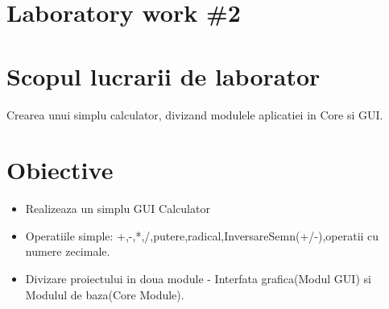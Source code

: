 \section*{Laboratory work \#2}

\section{Scopul lucrarii de laborator}
Crearea unui simplu calculator, divizand modulele aplicatiei in Core si GUI.
\section{Obiective}

\begin{itemize}
\item Realizeaza un simplu GUI Calculator
\item Operatiile simple: +,-,*,/,putere,radical,InversareSemn(+/-),operatii cu numere zecimale.
\item Divizare proiectului in doua module - Interfata grafica(Modul GUI) si Modulul de baza(Core Module).
	\end{itemize}

\clearpage